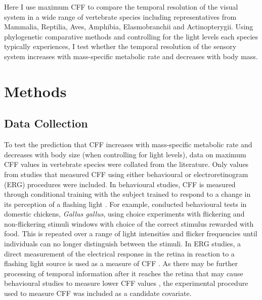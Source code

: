 Here I use maximum CFF to compare the temporal resolution of the visual system in a wide range of vertebrate species including representatives from Mammalia, Reptilia, Aves, Amphibia, Elasmobranchii and Actinopterygii. Using phylogenetic comparative methods and controlling for the light levels each species typically experiences, I test whether the temporal resolution of the sensory system increases with mass-specific metabolic rate and decreases with body mass.

\section{Methods}
\subsection{Data Collection}
To test the prediction that CFF increases with mass-specific metabolic rate and decreases with body size (when controlling for light levels), data on maximum CFF values in vertebrate species were collated from the literature. Only values from studies that measured CFF using either behavioural or electroretinogram (ERG) procedures were included. In behavioural studies, CFF is measured through conditional training with the subject trained to respond to a change in its perception of a flashing light \citep{d1998can,rubene2010presence}. For example, \cite{lisney2011behavioural} conducted behavioural tests in domestic chickens, \textit{Gallus gallus}, using choice experiments with flickering and non-flickering stimuli windows with choice of the correct stimulus rewarded with food. This is repeated over a range of light intensities and flicker frequencies until individuals can no longer distinguish between the stimuli. In ERG studies, a direct measurement of the electrical response in the retina in reaction to a flashing light source is used as a measure of CFF \citep{d1998can,schwartz2010visual}. As there may be further processing of temporal information after it reaches the retina that may cause behavioural studies to measure lower CFF values \citep{d1998can}, the experimental procedure used to measure CFF was included as a candidate covariate. 

